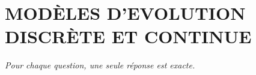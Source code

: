 
\section*{\textcolor{chapcolor}{\MakeUppercase{Modèles d'evolution discrète et continue}}}

\begin{center}
\textit{Pour chaque question, une seule réponse est exacte.}
\end{center}


